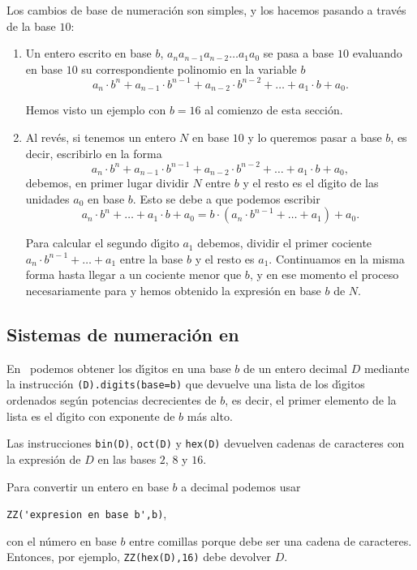 Los cambios de base de numeraci\'on son simples, y los hacemos pasando a
trav\'es de la base $10$:
\begin{enumerate}
 \item Un entero escrito en base $b$, $a_na_{n-1}a_{n-2}\dots a_1a_0$ se pasa a
base $10$ evaluando en base $10$ su correspondiente  polinomio en la variable
$b$
 \[a_n\cdot b^{n}+a_{n-1}\cdot b^{n-1}+ a_{n-2}\cdot b^{n-2}+\dots+a_1\cdot
b+a_0.\]
 
 Hemos visto un ejemplo con $b=16$ al comienzo de esta secci\'on.
 
 \item Al rev\'es, si tenemos un entero $N$ en base $10$ y lo queremos pasar a
base $b$, es decir, escribirlo en la forma 
 \[a_n\cdot b^{n}+a_{n-1}\cdot b^{n-1}+ a_{n-2}\cdot b^{n-2}+\dots+a_1\cdot
b+a_0,\]
 \noindent debemos, en primer lugar dividir $N$ entre $b$ y el resto es el
d\'{\i}gito de las unidades $a_0$ en base $b$. Esto se debe a que podemos
escribir 
 \[a_n\cdot b^{n}+\dots+a_1\cdot b+a_0=b\cdot (a_n\cdot
b^{n-1}+\dots+a_1)+a_0.\]
 
 Para calcular el segundo d\'{\i}gito $a_1$ debemos,  dividir el primer cociente
$a_n\cdot b^{n-1}+\dots+a_1$ entre la base $b$ y el resto es $a_1.$ Continuamos
en la misma forma hasta llegar a un cociente menor que $b$, y en ese momento el
proceso necesariamente para y hemos obtenido la expresi\'on en base $b$ de $N$.
 
\end{enumerate}



\subsection{Sistemas de numeraci\'on en \sage}


En \sage\ podemos obtener los d\'{\i}gitos en una base $b$ de un entero decimal
$D$ mediante la instrucci\'on \lstinline|(D).digits(base=b)| que devuelve una
lista de los d\'{\i}gitos ordenados seg\'un potencias decrecientes de $b$, es
decir, el primer elemento de la lista es el d\'{\i}gito con exponente de $b$
m\'as alto. 

Las instrucciones \lstinline|bin(D)|, \lstinline|oct(D)| y \lstinline|hex(D)|
devuelven cadenas de caracteres con la expresi\'on de $D$ en las bases $2$, $8$
y
$16$.

Para convertir un entero en base $b$ a decimal podemos usar
\begin{center}
\lstinline|ZZ('expresion en base b',b)|, 
\end{center}
\noindent con el n\'umero en base $b$ entre
comillas porque debe ser una cadena de caracteres. Entonces, por ejemplo, 
\lstinline|ZZ(hex(D),16)| debe devolver $D$.



